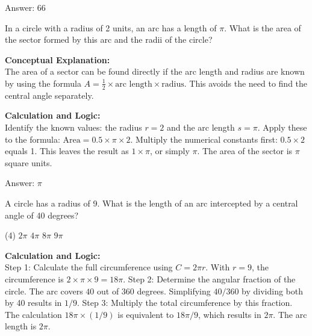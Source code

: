 \documentclass[11pt,paper=a4,answers]{exam}
\begin{document}
\begin{questions}
\begin{solution}
\vspace{30pt}

Answer: \colorbox{yellow!100}{66}
\end{solution}

\vspace{60pt}

\question
In a circle with a radius of 2 units, an arc has a length of $\pi$. What is the area of the sector formed by this arc and the radii of the circle?

\begin{solution}
\textbf{Conceptual Explanation:} \\
The area of a sector can be found directly if the arc length and radius are known by using the formula $A = \frac{1}{2} \times \text{arc length} \times \text{radius}$. This avoids the need to find the central angle separately.

\vspace{30pt}

\textbf{Calculation and Logic:} \\
Identify the known values: the radius $r = 2$ and the arc length $s = \pi$. Apply these to the formula: $\text{Area} = 0.5 \times \pi \times 2$. Multiply the numerical constants first: $0.5 \times 2$ equals 1. This leaves the result as $1 \times \pi$, or simply $\pi$. The area of the sector is $\pi$ square units.

\vspace{30pt}

Answer: \colorbox{yellow!100}{$\pi$}
\end{solution}

\vspace{60pt}

\question
A circle has a radius of 9. What is the length of an arc intercepted by a central angle of 40 degrees?
\begin{tasks}(4)
    \task $2\pi$
    \task $4\pi$
    \task $8\pi$
    \task $9\pi$
\end{tasks}

\begin{solution}
\textbf{Calculation and Logic:} \\
Step 1: Calculate the full circumference using $C = 2\pi r$. With $r = 9$, the circumference is $2 \times \pi \times 9 = 18\pi$. Step 2: Determine the angular fraction of the circle. The arc covers $40$ out of $360$ degrees. Simplifying $40 / 360$ by dividing both by 40 results in $1 / 9$. Step 3: Multiply the total circumference by this fraction. The calculation $18\pi \times (1 / 9)$ is equivalent to $18\pi / 9$, which results in $2\pi$. The arc length is $2\pi$.


\end{solution}
\end{questions}
\end{document}
